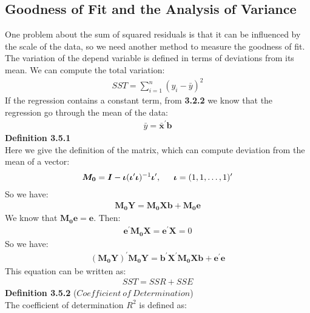\documentclass{article}
\begin{document}
\subsection{Goodness of Fit and the Analysis of Variance}
One problem about the sum of squared residuals is that it can be influenced by the scale of the data, so we need another method to measure the goodness of fit.\\
The variation of the depend variable is defined in terms of deviations from its mean. We can compute the total variation:
	\begin{align*}
		SST = \sum\limits^n_{i=1} (y_i - \bar{y})^2
	\end{align*}
If the regression contains a constant term, from \textbf{3.2.2} we know that the regression go through the mean of the data:
	\begin{align*}
		\bar{y} = \bar{\boldsymbol{x}}^\prime \boldsymbol{b}
	\end{align*}
\textbf{Definition 3.5.1}\\
Here we give the definition of the matrix, which can compute deviation from the mean of a vector:
	\begin{align*}
		\boldsymbol{M_0} = \boldsymbol{I} - \boldsymbol{\iota}(\boldsymbol{\iota}^\prime \boldsymbol{\iota})^{-1} \boldsymbol{\iota}^\prime,\indent \boldsymbol{\iota} = (1, 1, \ldots, 1)^\prime
	\end{align*}
So we have:
	\begin{align*}
		\boldsymbol{M_0} \boldsymbol{Y} = \boldsymbol{M_0} \boldsymbol{X} \boldsymbol{b} + \boldsymbol{M_0} \boldsymbol{e}
	\end{align*}
We know that $\boldsymbol{M_0} \boldsymbol{e} = \boldsymbol{e}$. Then:
	\begin{align*}
		\boldsymbol{e}^\prime \boldsymbol{M_0} \boldsymbol{X} = \boldsymbol{e}^\prime \boldsymbol{X} = 0
	\end{align*}
So we have:
	\begin{align*}
		(\boldsymbol{M_0} \boldsymbol{Y})^\prime \boldsymbol{M_0} \boldsymbol{Y} = \boldsymbol{b}^\prime \boldsymbol{X}^\prime \boldsymbol{M_0} \boldsymbol{X} \boldsymbol{b} + \boldsymbol{e}^\prime \boldsymbol{e}
	\end{align*}
This equation can be written as:
	\begin{align*}
		SST = SSR + SSE
	\end{align*}
\textbf{Definition 3.5.2} ($Coefficient\ of\ Determination$)\\
The coefficient of determination $R^2$ is defined as:
\end{document}
